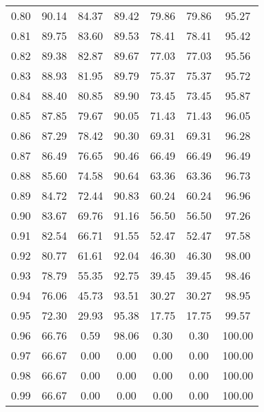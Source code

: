 \begin{tabular}{|c|c|c|c|c|c|c|}
      0.80 &     90.14 &     84.37 &      89.42 &   79.86 &      79.86 &         95.27 \\
      0.81 &     89.75 &     83.60 &      89.53 &   78.41 &      78.41 &         95.42 \\
      0.82 &     89.38 &     82.87 &      89.67 &   77.03 &      77.03 &         95.56 \\
      0.83 &     88.93 &     81.95 &      89.79 &   75.37 &      75.37 &         95.72 \\
      0.84 &     88.40 &     80.85 &      89.90 &   73.45 &      73.45 &         95.87 \\
      0.85 &     87.85 &     79.67 &      90.05 &   71.43 &      71.43 &         96.05 \\
      0.86 &     87.29 &     78.42 &      90.30 &   69.31 &      69.31 &         96.28 \\
      0.87 &     86.49 &     76.65 &      90.46 &   66.49 &      66.49 &         96.49 \\
      0.88 &     85.60 &     74.58 &      90.64 &   63.36 &      63.36 &         96.73 \\
      0.89 &     84.72 &     72.44 &      90.83 &   60.24 &      60.24 &         96.96 \\
      0.90 &     83.67 &     69.76 &      91.16 &   56.50 &      56.50 &         97.26 \\
      0.91 &     82.54 &     66.71 &      91.55 &   52.47 &      52.47 &         97.58 \\
      0.92 &     80.77 &     61.61 &      92.04 &   46.30 &      46.30 &         98.00 \\
      0.93 &     78.79 &     55.35 &      92.75 &   39.45 &      39.45 &         98.46 \\
      0.94 &     76.06 &     45.73 &      93.51 &   30.27 &      30.27 &         98.95 \\
      0.95 &     72.30 &     29.93 &      95.38 &   17.75 &      17.75 &         99.57 \\
      0.96 &     66.76 &      0.59 &      98.06 &    0.30 &       0.30 &        100.00 \\
      0.97 &     66.67 &      0.00 &       0.00 &    0.00 &       0.00 &        100.00 \\
      0.98 &     66.67 &      0.00 &       0.00 &    0.00 &       0.00 &        100.00 \\
      0.99 &     66.67 &      0.00 &       0.00 &    0.00 &       0.00 &        100.00 \\
\bottomrule
\end{tabular}
